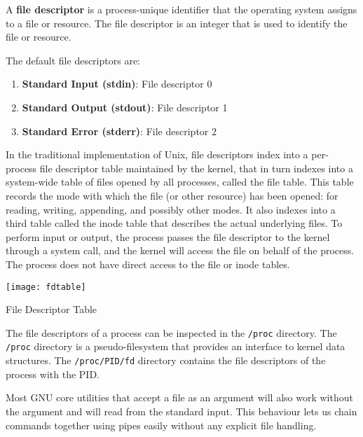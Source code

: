\begin{definition}
  A \textbf{file descriptor} is a process-unique identifier that the
  operating system assigns to a file or resource.
  The file descriptor is an integer that is used to identify
  the file or resource.
\end{definition}

The default file descriptors are:

\begin{enumerate}
  \item \textbf{Standard Input (stdin)}: File descriptor 0
  \item \textbf{Standard Output (stdout)}: File descriptor 1
  \item \textbf{Standard Error (stderr)}: File descriptor 2
\end{enumerate}

In the traditional implementation of Unix, file descriptors index
into a per-process file descriptor table maintained by the kernel,
that in turn indexes into a system-wide table of files opened by
all processes, called the file table. This table records the mode
with which the file (or other resource) has been opened: for
reading, writing, appending, and possibly other modes. It also indexes
into a third table called the inode table
that describes the actual
underlying files. To perform input or output, the process passes
the file descriptor to the kernel through a system call, and the
kernel will access the file on behalf of the process. The process
does not have direct access to the file or inode tables.

\begin{marginfigure}
  \texttt{[image: fdtable]}
  \caption{File Descriptor Table}
\end{marginfigure}

The file descriptors of a process can be inspected in the \texttt{/proc}
directory. The \texttt{/proc} directory is a pseudo-filesystem that
provides an interface to kernel data structures. The \texttt{/proc/PID/fd}
directory contains the file descriptors of the process with the PID.

Most GNU core utilities that accept a file as an argument will also
work without the argument and will read from the standard input.
This behaviour lets us chain commands together using pipes easily
without any explicit file handling.

